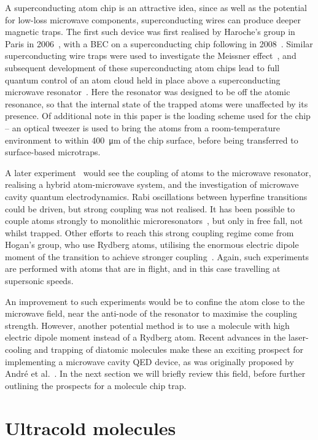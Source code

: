 A superconducting atom chip is an attractive idea, since as well as the
potential for low-loss microwave components, superconducting wires can produce
deeper magnetic traps. The first such device was first realised by
Haroche's group in Paris in 2006~\cite{Nirrengarten2006}, with a BEC on a
superconducting chip following in 2008~\cite{Roux2008}. Similar superconducting
wire traps were used to investigate the Meissner
effect~\cite{PhysRevLett.101.183006}, and subsequent development of these
superconducting atom chips lead to full quantum control of an atom cloud held
in place above a superconducting microwave resonator~\cite{Bernon2013}. Here
the resonator was designed to be off the atomic resonance, so that the internal
state of the trapped atoms were unaffected by its presence. Of additional note
in this paper is the loading scheme used for the chip -- an optical tweezer is
used to bring the atoms from a room-temperature environment to within
\SI{400}{\micro\meter} of the chip surface, before being transferred to
surface-based microtraps.

A later experiment~\cite{Hattermann2017} would see the coupling of atoms to the
microwave resonator, realising a hybrid atom-microwave system, and the
investigation of microwave cavity quantum electrodynamics. Rabi oscillations
between hyperfine transitions could be driven, but strong coupling was not
realised. It has been possible to couple atoms strongly to monolithic
microresonators~\cite{Aoki2006}, but only in free fall, not whilst trapped.
Other efforts to reach this strong coupling regime come from Hogan's group, who
use Rydberg atoms, utilising the enormous electric dipole moment of the
transition to achieve stronger coupling~\cite{PhysRevLett.124.193604}. Again,
such experiments are performed with atoms that are in flight, and in this case
travelling at supersonic speeds.

An improvement to such experiments would be to confine the atom close to the
microwave field, near the anti-node of the resonator to maximise the coupling
strength. However, another potential method is to use a molecule with high
electric dipole moment instead of a Rydberg atom. Recent advances in the
laser-cooling and trapping of diatomic molecules make these an exciting
prospect for implementing a microwave cavity QED device, as was originally
proposed by Andr\'e et al.~\cite{Andre2006}. In the next section we will
briefly review this field, before further outlining the prospects for a
molecule chip trap.

\section{Ultracold molecules}

